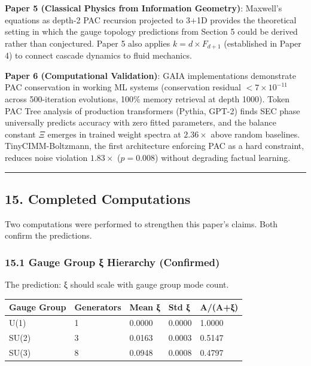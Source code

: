 \documentclass[
  11pt,
  a4paper]{article}
\begin{document}
\textbf{Paper 5 (Classical Physics from Information Geometry)}:
Maxwell's equations as depth-2 PAC recursion projected to 3+1D provides
the theoretical setting in which the gauge topology predictions from
Section 5 could be derived rather than conjectured. Paper 5 also applies
\(k = d \times F_{d+1}\) (established in Paper 4) to connect cascade
dynamics to fluid mechanics.

\textbf{Paper 6 (Computational Validation)}: GAIA implementations
demonstrate PAC conservation in working ML systems (conservation
residual \(< 7 \times 10^{-11}\) across 500-iteration evolutions, 100\%
memory retrieval at depth 1000). Token PAC Tree analysis of production
transformers (Pythia, GPT-2) finds SEC phase universally predicts
accuracy with zero fitted parameters, and the balance constant \(\Xi\)
emerges in trained weight spectra at \(2.36\times\) above random
baselines. TinyCIMM-Boltzmann, the first architecture enforcing PAC as a
hard constraint, reduces noise violation \(1.83\times\) (\(p = 0.008\))
without degrading factual learning.

\begin{center}\rule{0.5\linewidth}{0.5pt}\end{center}

\subsection{15. Completed Computations}\label{completed-computations}

Two computations were performed to strengthen this paper's claims. Both
confirm the predictions.

\subsubsection{15.1 Gauge Group ξ Hierarchy
(Confirmed)}\label{gauge-group-ux3be-hierarchy-confirmed}

The prediction: ξ should scale with gauge group mode count.

\begin{longtable}[]{@{}lllll@{}}
\toprule\noalign{}
Gauge Group & Generators & Mean ξ & Std ξ & A/(A+ξ) \\
\midrule\noalign{}
\endhead
\bottomrule\noalign{}
\endlastfoot
U(1) & 1 & 0.0000 & 0.0000 & 1.0000 \\
SU(2) & 3 & 0.0163 & 0.0003 & 0.5147 \\
SU(3) & 8 & 0.0948 & 0.0008 & 0.4797 \\
\end{longtable}
\end{document}
